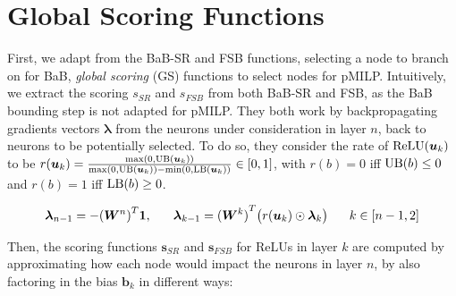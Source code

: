 \section{Global Scoring Functions}

\label{sec4p5}

First, we adapt from the BaB-SR \cite{BaB} and FSB \cite{FSB} functions, %
 selecting a node to branch on for BaB, {\em  global scoring} (GS) functions to select nodes for pMILP. Intuitively, we extract the scoring $s_{SR}$ and $s_{FSB}$ from both BaB-SR and FSB, as the BaB bounding step is not adapted for pMILP. They both work by backpropagating gradients vectors $\bm{\lambda}$ from the neurons under consideration in layer $n$, back to neurons to be potentially selected. To do so, they consider the rate of $\mathrm{ReLU}(\bm{u}_k)$ to be 
$r(\bm{u}_k)=\frac{\max(0,\mathrm{UB}(\bm{u}_k))}{\max(0,\mathrm{UB}(\bm{u}_k))-\min(0,\mathrm{LB}(\bm{u}_k))} \in [0,1]$, 
with $r(b)=0$ iff $\mathrm{UB}(b)\leq 0$ and $r(b)=1$ iff $\mathrm{LB}(b)\geq 0$.

\begin{align*}
\bm{\lambda}_{n-1} = -{(\bm{W}^n)}^T\bm{1}, \hspace*{4ex}  	\bm{\lambda}_{k-1} = {(\bm{W}^k)}^T\big( r(\bm{u}_k) \odot\bm{\lambda}_{k}\big) \hspace*{4ex}  k\in [n-1,2]
\end{align*}


Then, the scoring functions $\bm{s}_{SR}$ and $\bm{s}_{FSB}$ for ReLUs in layer $k$ are computed by approximating how each node would impact the neurons in layer $n$, by also factoring in the bias $\bm{b}_k$ in different ways:


